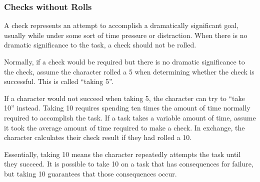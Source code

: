         \subsubsection{Checks without Rolls}
            A check represents an attempt to accomplish a dramatically significant goal, usually while under some sort of time pressure or distraction.
            When there is no dramatic significance to the task, a check should not be rolled.

            \label{Taking 5}
            Normally, if a check would be required but there is no dramatic significance to the check, assume the character rolled a 5 when determining whether the check is successful.
            This is called ``taking 5''.

            \label{Taking 10}
            If a character would not succeed when taking 5, the character can try to ``take 10'' instead.
            Taking 10 requires spending ten times the amount of time normally required to accomplish the task.
            If a task takes a variable amount of time, assume it took the average amount of time required to make a check.
            In exchange, the character calculates their check result if they had rolled a 10.

            Essentially, taking 10 means the character repeatedly attempts the task until they succeed.
            It is possible to take 10 on a task that has consequences for failure, but taking 10 guarantees that those consequences occur.
